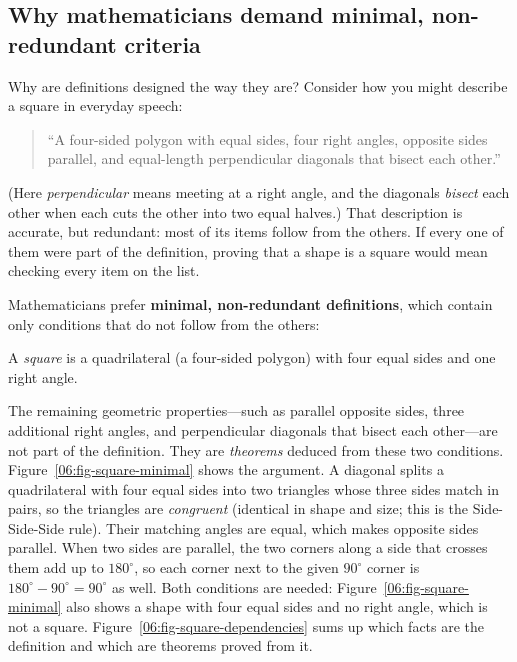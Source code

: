 \subsection{Why mathematicians demand minimal, non-redundant criteria}

Why are definitions designed the way they are? Consider how you might describe a square in everyday speech:
\begin{quote}
``A four-sided polygon with equal sides, four right angles, opposite sides parallel, and equal-length perpendicular diagonals that bisect each other.''
\end{quote}
(Here \emph{perpendicular} means meeting at a right angle, and the diagonals \emph{bisect} each other when each cuts the other into two equal halves.) That description is accurate, but redundant: most of its items follow from the others. If every one of them were part of the definition, proving that a shape is a square would mean checking every item on the list.

Mathematicians prefer \textbf{minimal, non-redundant definitions}, which contain only conditions that do not follow from the others:
\begin{definition}
A \emph{square} is a quadrilateral (a four-sided polygon) with four equal sides and one right angle.
\end{definition}
The remaining geometric properties---such as parallel opposite sides, three additional right angles, and perpendicular diagonals that bisect each other---are not part of the definition. They are \emph{theorems} deduced from these two conditions. Figure~\ref{06:fig-square-minimal} shows the argument. A diagonal splits a quadrilateral with four equal sides into two triangles whose three sides match in pairs, so the triangles are \emph{congruent} (identical in shape and size; this is the Side-Side-Side rule). Their matching angles are equal, which makes opposite sides parallel. When two sides are parallel, the two corners along a side that crosses them add up to $180^\circ$, so each corner next to the given $90^\circ$ corner is $180^\circ - 90^\circ = 90^\circ$ as well. Both conditions are needed: Figure~\ref{06:fig-square-minimal} also shows a shape with four equal sides and no right angle, which is not a square. Figure~\ref{06:fig-square-dependencies} sums up which facts are the definition and which are theorems proved from it.

